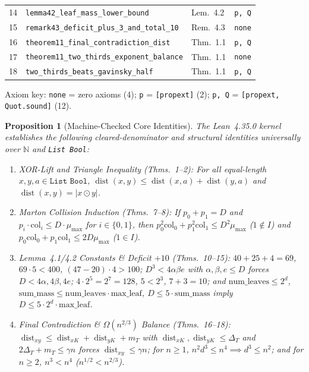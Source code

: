 \documentclass[10pt,twocolumn]{article}
\newtheorem{proposition}{Proposition}
\newcommand{\NN}{\mathbb{N}}
\newcommand{\dist}{\operatorname{dist}}
\begin{document}
\begin{table}[t]
\begin{tabular}{@{}rlll@{}}
14 & \texttt{lemma42\_leaf\_mass\_lower\_bound} & Lem.~4.2 & \texttt{p, Q} \\
15 & \texttt{remark43\_deficit\_plus\_3\_and\_total\_10} & Rem.~4.3 & \texttt{none} \\
16 & \texttt{theorem11\_final\_contradiction\_dist} & Thm.~1.1 & \texttt{p, Q} \\
17 & \texttt{theorem11\_two\_thirds\_exponent\_balance} & Thm.~1.1 & \texttt{none} \\
18 & \texttt{two\_thirds\_beats\_gavinsky\_half} & Thm.~1.1 & \texttt{p, Q} \\
\bottomrule
\end{tabular}
\vspace{-0.4em}
\begin{flushleft}
\tiny Axiom key: \texttt{none} = zero axioms (4); \texttt{p} = \texttt{[propext]} (2); \texttt{p, Q} = \texttt{[propext, Quot.sound]} (12).
\end{flushleft}
\vspace{-0.8em}
\end{table}

\begin{proposition}[Machine-Checked Core Identities]\label{prop:lean}
The Lean~4.35.0 kernel establishes the following cleared-denominator and structural identities universally over $\NN$ and \texttt{List Bool}:
\begin{enumerate}[leftmargin=*,nosep]
  \item \emph{XOR-Lift and Triangle Inequality (Thms.~1--2):} For all equal-length $x,y,a \in \texttt{List Bool}$, $\dist(x,y) \le \dist(x,a) + \dist(y,a)$ and $\dist(x,y) = |x \odot y|$.
  \item \emph{Marton Collision Induction (Thms.~7--8):} If $p_0 + p_1 = D$ and $p_i \cdot \mathrm{col}_i \le D \cdot \mu_{\max}$ for $i \in \{0,1\}$, then $p_0^2 \mathrm{col}_0 + p_1^2 \mathrm{col}_1 \le D^2 \mu_{\max}$ ($1 \notin I$) and $p_0 \mathrm{col}_0 + p_1 \mathrm{col}_1 \le 2 D \mu_{\max}$ ($1 \in I$).
  \item \emph{Lemma~4.1/4.2 Constants \& Deficit $+10$ (Thms.~10--15):} $40 + 25 + 4 = 69$, $69 \cdot 5 < 400$, $(47 - 20)\cdot 4 > 100$; $D^3 < 4\alpha\beta e$ with $\alpha,\beta,e \le D$ forces $D < 4\alpha, 4\beta, 4e$; $4\cdot 2^5 = 2^7 = 128$, $5 < 2^3$, $7 + 3 = 10$; and $\mathrm{num\_leaves} \le 2^d$, $\mathrm{sum\_mass} \le \mathrm{num\_leaves}\cdot \mathrm{max\_leaf}$, $D \le 5\cdot \mathrm{sum\_mass}$ imply $D \le 5 \cdot 2^d \cdot \mathrm{max\_leaf}$.
  \item \emph{Final Contradiction \& $\Omega(n^{2/3})$ Balance (Thms.~16--18):} $\dist_{xy} \le \dist_{xK} + \dist_{yK} + m_T$ with $\dist_{xK},\dist_{yK} \le \Delta_T$ and $2\Delta_T + m_T \le \gamma n$ forces $\dist_{xy} \le \gamma n$; for $n \ge 1$, $n^2 d^3 \le n^4 \implies d^3 \le n^2$; and for $n \ge 2$, $n^3 < n^4$ ($n^{1/2} < n^{2/3}$).
\end{enumerate}
\end{proposition}
\end{document}
